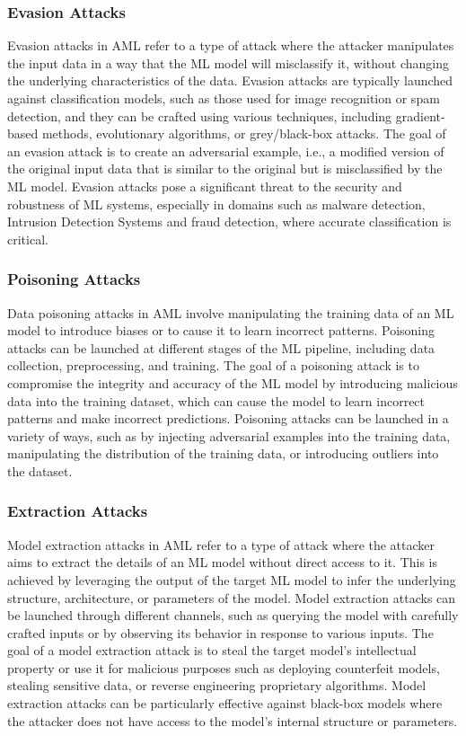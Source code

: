 \subsubsection{Evasion Attacks}
Evasion attacks in AML refer to a type of attack where the attacker manipulates the input data in a way that the ML
model will misclassify it, without changing the underlying characteristics of the data.
Evasion attacks are typically launched against classification models, such as those used for image recognition or spam
detection, and they can be crafted using various techniques, including gradient-based methods, evolutionary algorithms,
or grey/black-box attacks.
The goal of an evasion attack is to create an adversarial example, i.e., a modified version of the original input data
that is similar to the original but is misclassified by the ML model.
Evasion attacks pose a significant threat to the security and robustness of ML systems, especially in domains such as
malware detection, Intrusion Detection Systems and fraud detection, where accurate classification is critical.

\subsubsection{Poisoning Attacks}
Data poisoning attacks in AML involve manipulating the training data of an ML model to introduce biases or to cause it
to learn incorrect patterns.
Poisoning attacks can be launched at different stages of the ML pipeline, including data collection, preprocessing, and
training.
The goal of a poisoning attack is to compromise the integrity and accuracy of the ML model by introducing malicious
data into the training dataset, which can cause the model to learn incorrect patterns and make incorrect predictions.
Poisoning attacks can be launched in a variety of ways, such as by injecting adversarial examples into the training
data, manipulating the distribution of the training data, or introducing outliers into the dataset.

\subsubsection{Extraction Attacks}
Model extraction attacks in AML refer to a type of attack where the attacker aims to extract the details of an ML model
without direct access to it.
This is achieved by leveraging the output of the target ML model to infer the underlying structure, architecture, or
parameters of the model.
Model extraction attacks can be launched through different channels, such as querying the model with carefully crafted
inputs or by observing its behavior in response to various inputs.
The goal of a model extraction attack is to steal the target model's intellectual property or use it for malicious
purposes such as deploying counterfeit models, stealing sensitive data, or reverse engineering proprietary algorithms.
Model extraction attacks can be particularly effective against black-box models where the attacker does not have access
to the model's internal structure or parameters.

